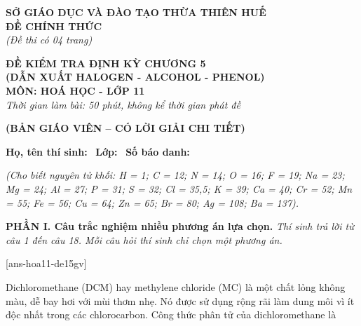 \documentclass[12pt,a4paper]{article}
\begin{document}
\thispagestyle{firstpage}

\noindent
\begin{minipage}[t]{0.44\textwidth}
	\centering\fontsize{10pt}{12pt}\selectfont
	\textbf{SỞ GIÁO DỤC VÀ ĐÀO TẠO THỪA THIÊN HUẾ}\\
	\textbf{ĐỀ CHÍNH THỨC}\\
	\textit{(Đề thi có 04 trang)}
\end{minipage}\hfill
\begin{minipage}[t]{0.54\textwidth}
	\centering\fontsize{10.5pt}{13pt}\selectfont
	\textbf{ĐỀ KIỂM TRA ĐỊNH KỲ CHƯƠNG 5}\\
	\textbf{(DẪN XUẤT HALOGEN - ALCOHOL - PHENOL)}\\
	\textbf{MÔN: HOÁ HỌC - LỚP 11}\\
	\textit{Thời gian làm bài: 50 phút, không kể thời gian phát đề}
	
	\smallskip
\end{minipage}

\smallskip
\begin{center}
	{\color{hfRed}\textbf{\large (BẢN GIÁO VIÊN -- CÓ LỜI GIẢI CHI TIẾT)}}
\end{center}

\smallskip
\noindent\hrulefill
\smallskip

\noindent\textbf{Họ, tên thí sinh:} \dotfill\ \textbf{Lớp:} \dotfill\ \textbf{Số báo danh:} \dotfill

\smallskip
\noindent\textit{(Cho biết nguyên tử khối: H = 1; C = 12; N = 14; O = 16; F = 19; Na = 23; Mg = 24; Al = 27; P = 31; S = 32; Cl = 35,5; K = 39; Ca = 40; Cr = 52; Mn = 55; Fe = 56; Cu = 64; Zn = 65; Br = 80; Ag = 108; Ba = 137).}
\smallskip

\noindent\textbf{\large PHẦN I. Câu trắc nghiệm nhiều phương án lựa chọn.}
\textit{Thí sinh trả lời từ câu 1 đến câu 18. Mỗi câu hỏi thí sinh chỉ chọn một phương án.}
\vspace{0.2cm}

[ans-hoa11-de15gv]

\begin{ex}
Dichloromethane (DCM) hay methylene chloride (MC) là một chất lỏng không màu, dễ bay hơi với mùi thơm nhẹ. Nó được sử dụng rộng rãi làm dung môi vì ít độc nhất trong các chlorocarbon. Công thức phân tử của dichloromethane là
\choice
{\True {}}
{}
{}
{}
\end{ex}
\end{document}
